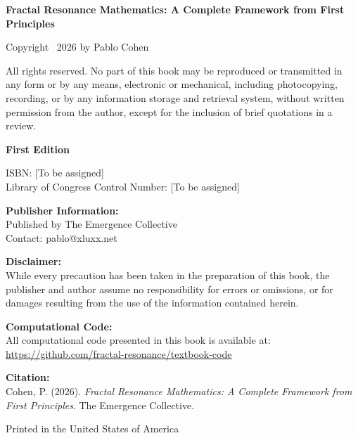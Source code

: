\thispagestyle{empty}

\vspace*{5cm}

\noindent
\textbf{Fractal Resonance Mathematics: A Complete Framework from First Principles}

\vspace{1cm}

\noindent
Copyright \textcopyright\ 2026 by Pablo Cohen

\vspace{0.5cm}

\noindent
All rights reserved. No part of this book may be reproduced or transmitted in any form or by any means, electronic or mechanical, including photocopying, recording, or by any information storage and retrieval system, without written permission from the author, except for the inclusion of brief quotations in a review.

\vspace{0.5cm}

\noindent
\textbf{First Edition}

\vspace{0.5cm}

\noindent
ISBN: [To be assigned]\\
Library of Congress Control Number: [To be assigned]

\vspace{1cm}

\noindent
\textbf{Publisher Information:}\\
Published by The Emergence Collective\\
Contact: pablo@xluxx.net

\vspace{1cm}

\noindent
\textbf{Disclaimer:}\\
While every precaution has been taken in the preparation of this book, the publisher and author assume no responsibility for errors or omissions, or for damages resulting from the use of the information contained herein.

\vspace{1cm}

\noindent
\textbf{Computational Code:}\\
All computational code presented in this book is available at:\\
\url{https://github.com/fractal-resonance/textbook-code}

\vspace{0.5cm}

\noindent
\textbf{Citation:}\\
Cohen, P. (2026). \textit{Fractal Resonance Mathematics: A Complete Framework from First Principles}. The Emergence Collective.

\vspace{1cm}

\noindent
Printed in the United States of America
